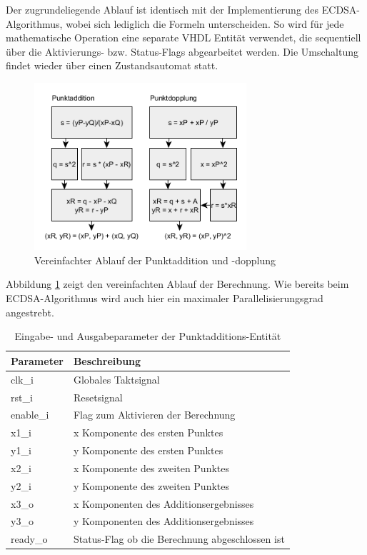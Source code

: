 Der zugrundeliegende Ablauf ist identisch mit der Implementierung des ECDSA-Algorithmus, wobei sich lediglich die Formeln unterscheiden. So wird für jede mathematische Operation eine separate VHDL Entität verwendet, die sequentiell über die Aktivierungs- bzw. Status-Flags abgearbeitet werden. Die Umschaltung findet wieder über einen Zustandsautomat statt.

\begin{figure}[thb]
	\centering
	\includegraphics[width=0.7\textwidth]{bilder/vhdl_pa_pd.png}
	\caption{Vereinfachter Ablauf der Punktaddition und -dopplung}
	\label{fig:vhdl-impl-pa-pd}
\end{figure}

Abbildung \ref{fig:vhdl-impl-pa-pd} zeigt den vereinfachten Ablauf der Berechnung. Wie bereits beim ECDSA-Algorithmus wird auch hier ein maximaler Parallelisierungsgrad angestrebt. \\

\begin{table} [h]
	\centering 
	\begin{tabular}{ | p{3cm} | p{12cm} | }
		\hline
		\textbf{Parameter} & \textbf{Beschreibung}\\
		\hline
		clk\_i & Globales Taktsignal \\
		\hline
		rst\_i & Resetsignal \\
		\hline
		enable\_i & Flag zum Aktivieren der Berechnung \\
		\hline
		x1\_i & x Komponente des ersten Punktes \\
		\hline
		y1\_i & y Komponente des ersten Punktes \\
		\hline
		x2\_i & x Komponente des zweiten Punktes \\
		\hline
		y2\_i & y Komponente des zweiten Punktes \\
		\hline
		x3\_o & x Komponenten des Additionsergebnisses \\
		\hline
		y3\_o & y Komponenten des Additionsergebnisses \\
		\hline
		ready\_o & Status-Flag ob die Berechnung abgeschlossen ist  \\
		\hline
		\hline
	\end{tabular}
	\caption{Eingabe- und Ausgabeparameter der Punktadditions-Entität}
	\label{tab:vhdl-impl-eccadd-param}
\end{table}

